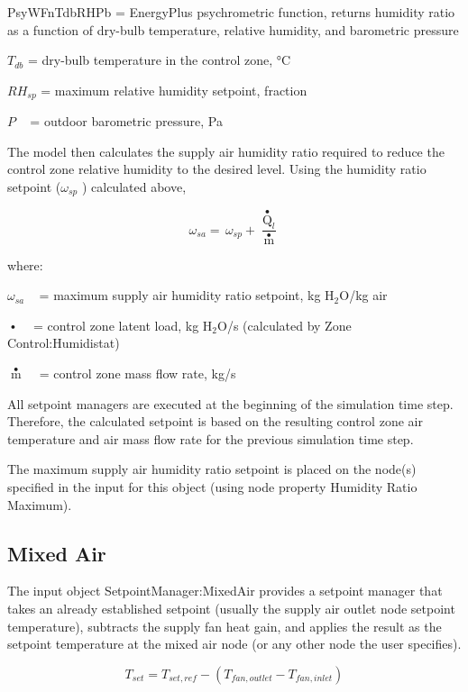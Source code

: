 PsyWFnTdbRHPb = EnergyPlus psychrometric function, returns humidity ratio as a function of dry-bulb temperature, relative humidity, and barometric pressure

\({T_{db}}\) = dry-bulb temperature in the control zone, °C

\(R{H_{sp}}\) = maximum relative humidity setpoint, fraction

\(P\) ~ = outdoor barometric pressure, Pa

The model then calculates the supply air humidity ratio required to reduce the control zone relative humidity to the desired level. Using the humidity ratio setpoint (\({\omega_{sp}}\) ) calculated above,

\begin{equation}
{\omega_{sa}} = \,{\omega_{sp}} + \frac{{{{\mathop Q\limits^ \bullet  }_l}}}{{\mathop m\limits^ \bullet  }}
\end{equation}

where:

\({\omega_{sa}}\) ~ = maximum supply air humidity ratio setpoint, kg H\(_{2}\)O/kg air

\(\mathop {{Q_l}}\limits^ \bullet\) ~ = control zone latent load, kg H\(_{2}\)O/s (calculated by Zone Control:Humidistat)

\(\mathop m\limits^ \bullet\) ~ = control zone mass flow rate, kg/s

All setpoint managers are executed at the beginning of the simulation time step. Therefore, the calculated setpoint is based on the resulting control zone air temperature and air mass flow rate for the previous simulation time step.

The maximum supply air humidity ratio setpoint is placed on the node(s) specified in the input for this object (using node property Humidity Ratio Maximum).

\subsection{Mixed Air}\label{mixed-air}

The input object SetpointManager:MixedAir provides a setpoint manager that takes an already established setpoint (usually the supply air outlet node setpoint temperature), subtracts the supply fan heat gain, and applies the result as the setpoint temperature at the mixed air node (or any other node the user specifies).

\begin{equation}
{T_{set}} = {T_{set,ref}} - ({T_{fan,outlet}} - {T_{fan,inlet}})
\end{equation}

